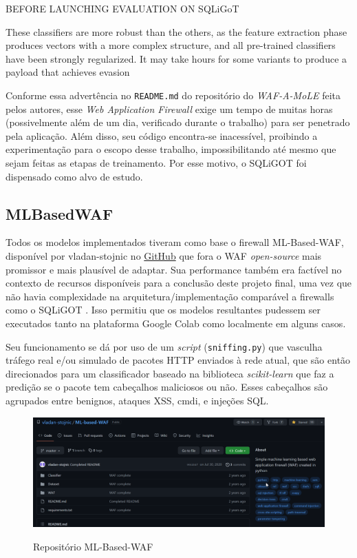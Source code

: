 \begin{citacao}[english]
BEFORE LAUNCHING EVALUATION ON SQLiGoT

These classifiers are more robust than the others, as the feature extraction phase produces vectors with a more complex structure, and all pre-trained classifiers have been strongly regularized. It may take hours for some variants to produce a payload that achieves evasion
\end{citacao}
\bigskip

Conforme essa advertência no \verb+README.md+ do repositório do \textit{WAF-A-MoLE} feita pelos autores, esse \textit{Web Application Firewall} exige um tempo de muitas horas (possivelmente além de um dia, verificado durante o trabalho) para ser penetrado pela aplicação. Além disso, seu código encontra-se inacessível, proibindo a experimentação para o escopo desse trabalho, impossibilitando até mesmo que sejam feitas as etapas de treinamento. Por esse motivo, o SQLiGOT \cite{kar2016sqligot} foi dispensado como alvo de estudo.

\subsection{MLBasedWAF}
Todos os modelos implementados tiveram como base o firewall ML-Based-WAF, disponível por vladan-stojnic no \href{https://github.com/vladan-stojnic/ML-based-WAF}{GitHub} \cite{ml_based_waf} que fora o WAF \textit{open-source} mais promissor e mais plausível de adaptar. Sua performance também era factível no contexto de recursos disponíveis para a conclusão deste projeto final, uma vez que não havia complexidade na arquitetura/implementação comparável a firewalls como o SQLiGOT \cite{kar2016sqligot}. Isso permitiu que os modelos resultantes pudessem ser executados tanto na plataforma Google Colab como localmente em alguns casos.

Seu funcionamento se dá por uso de um \textit{script} (\verb+sniffing.py+) que vasculha tráfego real e/ou simulado de pacotes HTTP enviados à rede atual, que são então direcionados para um classificador baseado na biblioteca \textit{scikit-learn} que faz a predição se o pacote tem cabeçalhos maliciosos ou não. Esses cabeçalhos são agrupados entre benignos, ataques XSS, cmdi, e injeções SQL.

\begin{figure}[ht]
    \centering
    \caption{Repositório ML-Based-WAF}
    \includegraphics[width=16cm]{figuras/MLBasedWAF.png} 
    \label{fig:internet} 
\end{figure}

